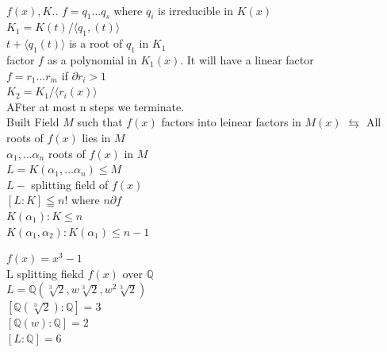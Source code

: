 \documentclass{article}
\begin{document}
\begin{lemma} \leavevmode \\ 
    $f(x), K$.. $f = q_1 \hdots q_s$ where $q_i$ is irreducible in $K(x)$ \\
    $K_1 = K(t) / \langle q_1, (t) \rangle$ \\ 
    $t+ \langle q_1(t) \rangle$ is a root of $q_1$ in $K_1$ \\
    factor $f$ as a polynomial in $K_1(x)$. It will have a linear factor \\
    $f = r_1 \hdots r_m$ if $\partial r_i > 1$ \\
    $K_2 = K_1 / \langle r_i(x) \rangle$ \\
    AFter at most n steps we terminate. 
    \\ 
    Built Field $M$ such that $f(x)$ factors into leinear factors in $M(x)$ 
    $\leftrightarrows$ All roots of $f(x)$ lies in $M$ \\ 
    $\alpha_1, \dots \alpha_n$ roots of $f(x)$ in $M$ \\ 
    $L = K(\alpha_1, \dots \alpha_n) \leq M$ \\ 
    $L-$ splitting field of $f(x)$ \\ 
    $[L: K] \leqq n!$ where $n \partial f$ \\ 
    $K{(\alpha_1) : K} \leq n $\\ 
    $K{(\alpha_1, \alpha_2) : K(\alpha_1)} \leq n-1$ \\

\end{lemma}

$f(x) = x^3 - 1$ \\ L splitting fiekd $f(x)$ over $\mathbb{Q}$ 
\\ 
$L = \mathbb{Q}(\sqrt[3]{2}, w\sqrt[3]{2}, w^2\sqrt[3]{2})$ \\
$[\mathbb{Q}(\sqrt[3]{2}): \mathbb{Q}] = 3$ \\
$[\mathbb{Q}(w): \mathbb{Q}] = 2$ \\  
$[L : \mathbb{Q}] = 6$
\end{document}
